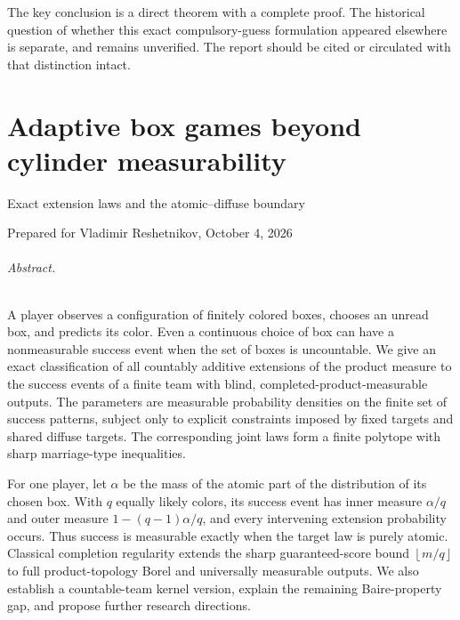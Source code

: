 \documentclass[11pt,letterpaper]{article}
\theoremstyle{definition}
\newcommand{\floor}[1]{\left\lfloor #1\right\rfloor}
\begin{document}
The key conclusion is a direct theorem with a complete proof.
The historical question of whether this exact compulsory-guess
formulation appeared elsewhere is separate, and remains unverified.
The report should be cited or circulated with that distinction
intact.


\clearpage
{}
\part{Adaptive box games beyond cylinder measurability}
\label{mbg:ext:part}

\setcounter{section}{29}
\renewcommand{\thesection}{\arabic{section}}
\renewcommand{\theHsection}{ext.\arabic{section}}
\makeatletter\gdef\Hy@chapapp{\Hy@chapterstring}\makeatother
\setcounter{equation}{0}
\renewcommand{\theequation}{III.\arabic{equation}}
\renewcommand{\theHequation}{ext.\arabic{equation}}

{\large Exact extension laws and the atomic--diffuse boundary\par}
\smallskip
{Prepared for Vladimir Reshetnikov, October 4, 2026\par}

\paragraph{Abstract.}
A player observes a configuration of finitely colored boxes, chooses an unread box, and predicts its color. Even a continuous choice of box can have a nonmeasurable success event when the set of boxes is uncountable. We give an exact classification of all countably additive extensions of the product measure to the success events of a finite team with blind, completed-product-measurable outputs. The parameters are measurable probability densities on the finite set of success patterns, subject only to explicit constraints imposed by fixed targets and shared diffuse targets. The corresponding joint laws form a finite polytope with sharp marriage-type inequalities.

For one player, let $\alpha$ be the mass of the atomic part of the distribution of its chosen box. With $q$ equally likely colors, its success event has inner measure $\alpha/q$ and outer measure $1-(q-1)\alpha/q$, and every intervening extension probability occurs. Thus success is measurable exactly when the target law is purely atomic. Classical completion regularity extends the sharp guaranteed-score bound $\floor{m/q}$ to full product-topology Borel and universally measurable outputs. We also establish a countable-team kernel version, explain the remaining Baire-property gap, and propose further research directions.
\end{document}
